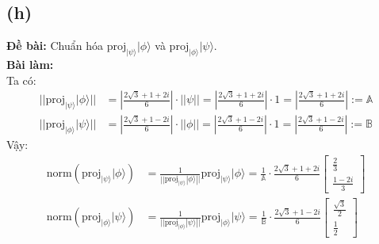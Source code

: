 \subsection{(h)}
\textbf{Đề bài:} Chuẩn hóa $\mathrm{proj}_{|\psi\rangle}|\phi\rangle$ và $\mathrm{proj}_{|\phi\rangle}|\psi\rangle$.\\
\textbf{Bài làm:}\\
Ta có:
\begin{align*}
    ||\mathrm{proj}_{|\psi\rangle}|\phi\rangle|| & = \left|\frac{2\sqrt{3} + 1 + 2i}{6}\right| \cdot ||\psi|| = \left|\frac{2\sqrt{3} + 1 + 2i}{6}\right| \cdot 1 = \left|\frac{2\sqrt{3} + 1 + 2i}{6}\right| := \mathbb{A} \\
    ||\mathrm{proj}_{|\phi\rangle}|\psi\rangle|| & = \left|\frac{2\sqrt{3} + 1 - 2i}{6}\right| \cdot ||\phi|| = \left|\frac{2\sqrt{3} + 1 - 2i}{6}\right| \cdot 1 = \left|\frac{2\sqrt{3} + 1 - 2i}{6}\right| := \mathbb{B}
\end{align*}
Vậy:
\begin{align*}
    \mathrm{norm}(\mathrm{proj}_{|\psi\rangle}|\phi\rangle) & = \frac{1}{||\mathrm{proj}_{|\psi\rangle}|\phi\rangle||} \mathrm{proj}_{|\psi\rangle}|\phi\rangle = \frac{1}{\mathbb{A}} \cdot \frac{2\sqrt{3} + 1 + 2i}{6} \begin{bmatrix}
                                                                                                                                                                                                                              \frac{2}{3} \\
                                                                                                                                                                                                                              \frac{1-2i}{3}
                                                                                                                                                                                                                          \end{bmatrix}                    \\
    \mathrm{norm}(\mathrm{proj}_{|\phi\rangle}|\psi\rangle) & = \frac{1}{||\mathrm{proj}_{|\phi\rangle}|\psi\rangle||} \mathrm{proj}_{|\phi\rangle}|\psi\rangle = \frac{1}{\mathbb{B}} \cdot \frac{2\sqrt{3} + 1 - 2i}{6} \begin{bmatrix}
                                                                                                                                                                                                                              \frac{\sqrt{3}}{2} \\
                                                                                                                                                                                                                              \frac{1}{2}
                                                                                                                                                                                                                          \end{bmatrix}
\end{align*}

